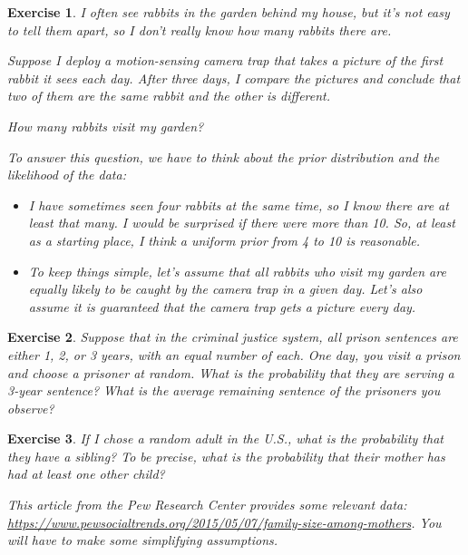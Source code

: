 \documentclass[12pt]{book}
\theoremstyle{exercise}
\newtheorem{exercise}{Exercise}[chapter]
\begin{document}
\begin{exercise}
I often see rabbits in the garden behind my house, but it's not easy to tell them apart, so I don't really know how many rabbits there are.

Suppose I deploy a motion-sensing camera trap that takes a picture of the first rabbit it sees each day.  After three days, I compare the pictures and conclude that two of them are the same rabbit and the other is different.

How many rabbits visit my garden?

To answer this question, we have to think about the prior distribution and the likelihood of the data:

\begin{itemize}

\item I have sometimes seen four rabbits at the same time, so I know there are at least that many.  I would be surprised if there were more than 10.  So, at least as a starting place, I think a uniform prior from 4 to 10 is reasonable.

\item To keep things simple, let's assume that all rabbits who visit my garden are equally likely to be caught by the camera trap in a given day.  Let's also assume it is guaranteed that the camera trap gets a picture every day.

\end{itemize}

\end{exercise}

\begin{exercise}
Suppose that in the criminal justice system, all prison sentences are either 1, 2, or 3 years, with an equal number of each.  One day, you visit a prison and choose a prisoner at random.  What is the probability that they are serving a 3-year sentence?  What is the average remaining sentence of the prisoners you observe?
\end{exercise}


\begin{exercise}
If I chose a random adult in the U.S., what is the probability that they have a sibling? To be precise, what is the probability that their mother has had at least one other child?

This article from the Pew Research Center provides some relevant data: \url{https://www.pewsocialtrends.org/2015/05/07/family-size-among-mothers}.  You will have to make some simplifying assumptions.
\end{exercise}
\end{document}

